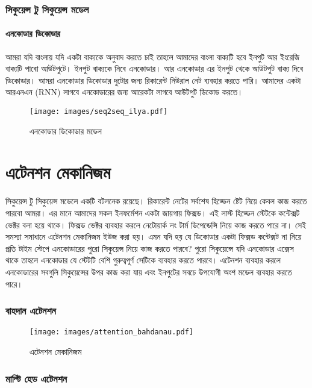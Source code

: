 \documentclass{book}
\begin{document}
\subsection{সিকুয়েন্স টু সিকুয়েন্স মডেল} 
\subsubsection{এনকোডার ডিকোডার}
আমরা যদি বাংলায় যদি একটা বাক্যকে অনুবাদ করতে চাই তাহলে আমাদের বাংলা বাক্যটি হবে ইনপুট আর ইংরেজি বাক্যটি পাবো আউটপুটে। 
ইনপুট বাক্যকে নিবে এনকোডার। আর এনকোডার এর ইনপুট থেকে আউটপুট বাক্য দিবে ডিকোডার। আমরা এনকোডার ডিকোডার দুটোর জন্য রিকারেন্ট নিউরাল নেট ব্যবহার করতে পারি।
আমাদের একটা আরএনএন (RNN)  লাগবে এনকোডারের জন্য আরেকটা লাগবে আউটপুট ডিকোড করতে। 
\begin{figure}[htbp] %
   \centering
   \texttt{[image: images/seq2seq\_ilya.pdf]} 
   \caption{এনকোডার ডিকোডার মডেল }
   \label{fig:seq2seq}
\end{figure} 


\chapter{এটেনশন মেকানিজম}
সিকুয়েন্স টু সিকুয়েন্স মডেলে একটি বটলনেক রয়েছে। রিকারেন্ট নেটের সর্বশেষ হিড্ডেন ষ্টেট নিয়ে কেবল কাজ করতে পারবো আমরা। এর মানে আমাদের সকল ইনফর্মেশন একটা জায়গায় ফিক্সড।
এই লাস্ট হিড্ডেন স্টেটকে কন্টেক্সট ভেক্টর বলা হয়ে থাকে। ফিক্সড ভেক্টর ব্যবহার করলে নেটোয়ার্ক লং টার্ম ডিপেন্ডেন্সি নিয়ে কাজ করতে পারে না।
 সেই সমস্যা সমাধানে এটেনশন মেকানিজম ইউজ করা হয়। এমন যদি হয় যে ডিকোডার একটা ফিক্সড কন্টেক্সট না নিয়ে প্রতি টাইম স্টেপে এনকোডারের পুরো সিকুয়েন্স নিয়ে কাজ করতে পারবে?
 পুরো সিকুয়েন্সে যদি এনকোডার এক্সেস থাকে তাহলে এনকোডার যে স্টেটটি বেশি গুরুত্বপূর্ণ সেটিকে ব্যবহার করতে পারবে।  
 এটেনশন ব্যবহার করলে এনকোডারের সবগুলি সিকুয়েন্সের উপর কাজ করা যায় এবং ইনপুটের সবচে উপযোগী অংশ মডেল ব্যবহার করতে পারে। 

\subsection{বাহদান এটেনশন}

\begin{figure}[htbp] %
   \centering
   \texttt{[image: images/attention\_bahdanau.pdf]} 
   \caption{এটেনশন মেকানিজম}
   \label{fig:attn_bahdanau}
\end{figure} 

\subsection{মাল্টি হেড এটেনশন}
\end{document}
